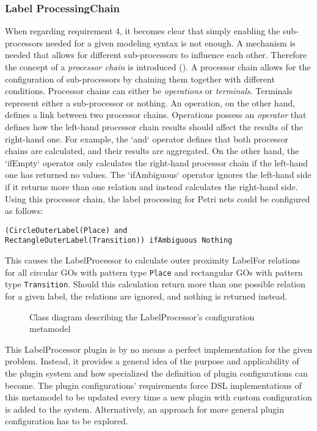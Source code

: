 \subsubsection{Label ProcessingChain}
When regarding requirement 4, it becomes clear that simply enabling the sub-processors needed for a given modeling syntax is not enough. A mechanism is needed that allows for different sub-processors to influence each other. Therefore the concept of a \emph{processor chain} is introduced (). A processor chain allows for the configuration of sub-processors by chaining them together with different conditions. Processor chains can either be \emph{operations} or \emph{terminals}. Terminals represent either a sub-processor or nothing. An operation, on the other hand, defines a link between two processor chains. Operations possess an \emph{operator} that defines how the left-hand processor chain results should affect the results of the right-hand one. For example, the `and` operator defines that both processor chains are calculated, and their results are aggregated. On the other hand, the `ifEmpty` operator only calculates the right-hand processor chain if the left-hand one has returned no values. The `ifAmbiguous` operator ignores the left-hand side if it returns more than one relation and instead calculates the right-hand side. Using this processor chain, the label processing for Petri nets could be configured as follows:
\begin{lstlisting}[captionpos=b,caption={LabelPlugin configuration for a Petri nets syntax.}]
(CircleOuterLabel(Place) and 
RectangleOuterLabel(Transition)) ifAmbiguous Nothing
\end{lstlisting}
This causes the LabelProcessor to calculate outer proximity LabelFor relations for all circular GOs with pattern type \texttt{Place} and rectangular GOs with pattern type \texttt{Transition}. Should this calculation return more than one possible relation for a given label, the relations are ignored, and nothing is returned instead.

\begin{figure}[ht]
  \centering
  
  \caption{Class diagram describing the LabelProcessor's configuration metamodel}
  \label{fig:labelprocessor-config}
\end{figure}

This LabelProcessor plugin is by no means a perfect implementation for the given problem. Instead, it provides a general idea of the purpose and applicability of the plugin system and how specialized the definition of plugin configurations can become. The plugin configurations' requirements force DSL implementations of this metamodel to be updated every time a new plugin with custom configuration is added to the system. Alternatively, an approach for more general plugin configuration has to be explored.


